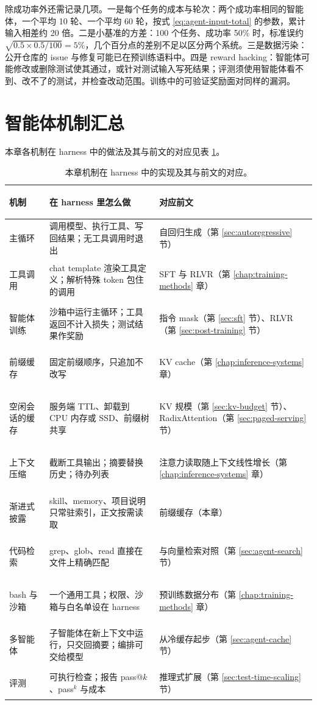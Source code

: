 除成功率外还需记录几项。一是每个任务的成本与轮次：两个成功率相同的智能体，一个平均 10 轮、一个平均 60 轮，按式 \eqref{eq:agent-input-total} 的参数，累计输入相差约 20 倍。二是小基准的方差：100 个任务、成功率 50\% 时，标准误约 \(\sqrt{0.5\times0.5/100}=5\%\)，几个百分点的差别不足以区分两个系统。三是数据污染：公开仓库的 issue 与修复可能已在预训练语料中。四是 reward hacking：智能体可能修改或删除测试使其通过，或针对测试输入写死结果；评测须使用智能体看不到、改不了的测试，并检查改动范围。训练中的可验证奖励面对同样的漏洞。

\clearpage
\section{智能体机制汇总}

本章各机制在 harness 中的做法及其与前文的对应见表 \ref{tab:agent-mechanisms}。

\begin{table}[H]
\centering\small
\begin{tabularx}{\textwidth}{>{\bfseries\raggedright\arraybackslash}p{26mm} >{\raggedright\arraybackslash}X >{\raggedright\arraybackslash}p{45mm}}
\toprule
机制 & 在 harness 里怎么做 & 对应前文\\
\midrule
主循环 & 调用模型、执行工具、写回结果；无工具调用时退出 & 自回归生成（第 \ref{sec:autoregressive} 节）\\
工具调用 & chat template 渲染工具定义；解析特殊 token 包住的调用 & SFT 与 RLVR（第 \ref{chap:training-methods} 章）\\
智能体训练 & 沙箱中运行主循环；工具返回不计入损失；测试结果作奖励 & 指令 mask（第 \ref{sec:sft} 节）、RLVR（第 \ref{sec:post-training} 节）\\
前缀缓存 & 固定前缀顺序，只追加不改写 & KV cache（第 \ref{chap:inference-systems} 章）\\
空闲会话的缓存 & 服务端 TTL、卸载到 CPU 内存或 SSD、前缀树共享 & KV 规模（第 \ref{sec:kv-budget} 节）、RadixAttention（第 \ref{sec:paged-serving} 节）\\
上下文压缩 & 截断工具输出；摘要替换历史；待办列表 & 注意力读取随上下文线性增长（第 \ref{chap:inference-systems} 章）\\
渐进式披露 & skill、memory、项目说明只常驻索引，正文按需读取 & 前缀缓存（本章）\\
代码检索 & grep、glob、read 直接在文件上精确匹配 & 与向量检索对照（第 \ref{sec:agent-search} 节）\\
bash 与沙箱 & 一个通用工具；权限、沙箱与白名单设在 harness & 预训练数据分布（第 \ref{chap:training-methods} 章）\\
多智能体 & 子智能体在新上下文中运行，只交回摘要；编排可交给模型 & 从冷缓存起步（第 \ref{sec:agent-cache} 节）\\
评测 & 可执行检查；报告 pass@\(k\)、pass\(^k\) 与成本 & 推理式扩展（第 \ref{sec:test-time-scaling} 节）\\
\bottomrule
\end{tabularx}
\caption{本章机制在 harness 中的实现及其与前文的对应。}
\label{tab:agent-mechanisms}
\end{table}
